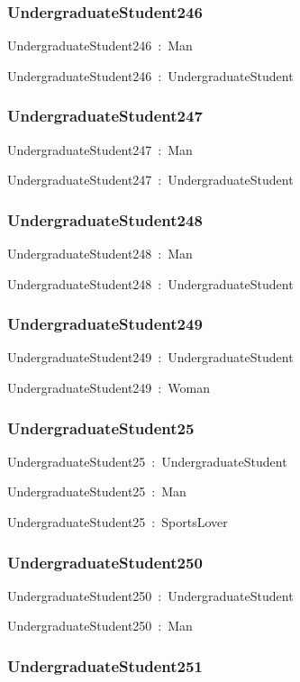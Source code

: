 \documentclass{article}
\begin{document}
\subsubsection*{UndergraduateStudent246}

UndergraduateStudent246~:~Man

UndergraduateStudent246~:~UndergraduateStudent

\subsubsection*{UndergraduateStudent247}

UndergraduateStudent247~:~Man

UndergraduateStudent247~:~UndergraduateStudent

\subsubsection*{UndergraduateStudent248}

UndergraduateStudent248~:~Man

UndergraduateStudent248~:~UndergraduateStudent

\subsubsection*{UndergraduateStudent249}

UndergraduateStudent249~:~UndergraduateStudent

UndergraduateStudent249~:~Woman

\subsubsection*{UndergraduateStudent25}

UndergraduateStudent25~:~UndergraduateStudent

UndergraduateStudent25~:~Man

UndergraduateStudent25~:~SportsLover

\subsubsection*{UndergraduateStudent250}

UndergraduateStudent250~:~UndergraduateStudent

UndergraduateStudent250~:~Man

\subsubsection*{UndergraduateStudent251}
\end{document}
